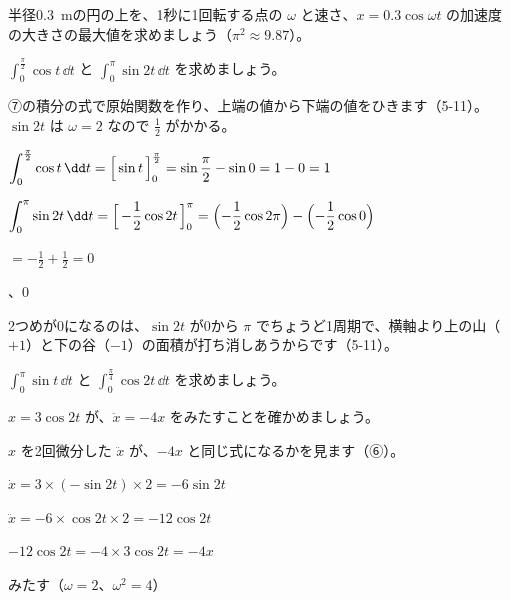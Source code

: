 \begin{jibun}
半径\qty{0.3}{m}の円の上を、1秒に1回転する点の $\omega$ と速さ、$x=0.3\cos\omega t$ の加速度の大きさの最大値を求めましょう（$\pi^2\approx9.87$）。
\end{jibun}

\begin{reidai}
$\displaystyle\int_0^{\frac{\pi}{2}}\cos t\,\dd t$ と $\displaystyle\int_0^{\pi}\sin2t\,\dd t$ を求めましょう。\par
\kangaekata ⑦の積分の式で原始関数を作り、上端の値から下端の値をひきます（5-11）。$\sin2t$ は $\omega=2$ なので $\frac{1}{2}$ がかかる。\par
\shiki $\displaystyle\int_0^{\frac{\pi}{2}}\cos t\,\dd t=\Bigl[\,\sin t\,\Bigr]_0^{\frac{\pi}{2}}=\sin\frac{\pi}{2}-\sin0=1-0=1$\par\vspace{2pt}
\hspace*{2.6\zw}$\displaystyle\int_0^{\pi}\sin2t\,\dd t=\Bigl[\,-\frac{1}{2}\cos2t\,\Bigr]_0^{\pi}=\Bigl(-\frac{1}{2}\cos2\pi\Bigr)-\Bigl(-\frac{1}{2}\cos0\Bigr)$\par\vspace{2pt}
\hspace*{4.6\zw}$\displaystyle=-\frac{1}{2}+\frac{1}{2}=0$\par
{}、0
\end{reidai}
2つめが0になるのは、$\sin2t$ が0から $\pi$ でちょうど1周期で、横軸より上の山（$+1$）と下の谷（$-1$）の面積が打ち消しあうからです（5-11）。

\begin{jibun}
$\displaystyle\int_0^{\pi}\sin t\,\dd t$ と $\displaystyle\int_0^{\frac{\pi}{4}}\cos2t\,\dd t$ を求めましょう。
\end{jibun}

\begin{reidai}[$\ddot{x}=-\omega^2x$ を確かめる]
$x=3\cos2t$ が、$\ddot{x}=-4x$ をみたすことを確かめましょう。\par
\kangaekata $x$ を2回微分した $\ddot{x}$ が、$-4x$ と同じ式になるかを見ます（⑥）。\par
\shiki $\dot{x}=3\times(-\sin2t)\times2=-6\sin2t$\par
\hspace*{2.6\zw}$\ddot{x}=-6\times\cos2t\times2=-12\cos2t$\par
\hspace*{2.6\zw}$-12\cos2t=-4\times3\cos2t=-4x$\par
\kotae みたす（$\omega=2$、$\omega^2=4$）
\end{reidai}

